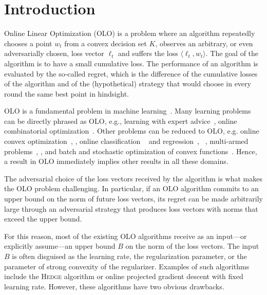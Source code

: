 \section{Introduction}
\label{section:introduction}

Online Linear Optimization (OLO) is a problem where an algorithm repeatedly
chooses a point $w_t$ from a convex decision set $K$, observes an arbitrary, or
even adversarially chosen, loss vector $\ell_t$ and suffers the loss $\langle
\ell_t, w_t \rangle$.  The goal of the algorithm is to have a small cumulative
loss. The performance of an algorithm is evaluated by the so-called regret, which
is the difference of the cumulative losses of the algorithm and of the
(hypothetical) strategy that would choose in every round the same best point in
hindsight.

OLO is a fundamental problem in machine
learning~\cite{Cesa-Bianchi-Lugosi-2006, Rakhlin-Sridharan-2009,
Shalev-Shwartz-2011}.  Many learning problems can be directly phrased as OLO,
e.g., learning with expert advice~\cite{Littlestone-Warmuth-1994, Vovk-1998,
Freund-Schapire-1997, Cesa-Bianchi-Haussler-Helmbold-Schapire-Warmuth-1997},
online combinatorial optimization~\cite{Kalai-Vempala-2005,
Helmbold-Warmuth-2009, Koolen-Warmuth-Kivinen-2010}. Other problems can be
reduced to OLO, e.g. online convex
optimization~\cite{Abernethy-Bartlett-Rakhlin-Tewari-2008},
\cite[Chapter~2]{Shalev-Shwartz-2011}, online classification
~\cite{Rosenblatt-1958,Freund-Schapire-1999} and
regression~\cite{Kivinen-Warmuth-1997},
~\cite[Chapters~11~and~12]{Cesa-Bianchi-Lugosi-2006}, multi-armed
problems~\cite[Chapter~6]{Cesa-Bianchi-Lugosi-2006},
\cite{Abernethy-Hazan-Rakhlin-2008, Bubeck-Cesa-Bianchi-2012}, and batch
and stochastic optimization of convex functions~\cite{Nemirovski-Yudin-1983,
Bubeck-2015}.  Hence, a result in OLO immediately implies other results in all
these domains.

The adversarial choice of the loss vectors received by the algorithm is what
makes the OLO problem challenging. In particular, if an OLO algorithm commits
to an upper bound on the norm of future loss vectors, its regret can be made
arbitrarily large through an adversarial strategy that produces loss vectors
with norms that exceed the upper bound.

For this reason, most of the existing OLO algorithms receive as an input---or
explicitly assume---an upper bound $B$ on the norm of the loss vectors.  The
input $B$ is often disguised as the learning rate, the regularization
parameter, or the parameter of strong convexity of the regularizer. Examples of
such algorithms include the \textsc{Hedge} algorithm or online projected
gradient descent with fixed learning rate.  However, these algorithms have two
obvious drawbacks.


